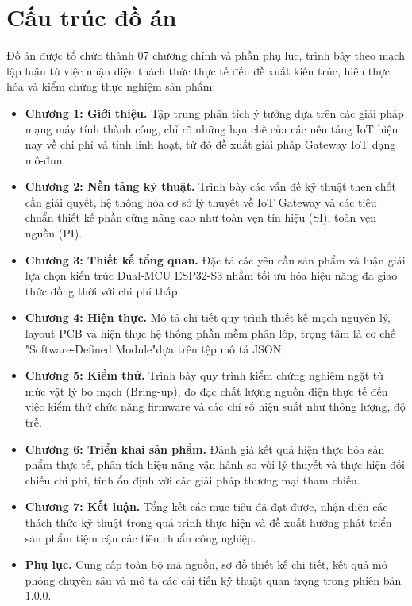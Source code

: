 \section{Cấu trúc đồ án}
    Đồ án được tổ chức thành 07 chương chính và phần phụ lục, trình bày theo mạch lập luận từ việc nhận diện thách thức thực tế đến đề xuất kiến trúc, hiện thực hóa và kiểm chứng thực nghiệm sản phẩm:

    \begin{itemize}
        \item \textbf{Chương 1: Giới thiệu.} Tập trung phân tích ý tưởng dựa trên các giải pháp mạng máy tính thành công, chỉ rõ những hạn chế của các nền tảng IoT hiện nay về chi phí và tính linh hoạt, từ đó đề xuất giải pháp Gateway IoT dạng mô-đun.
        
        \item \textbf{Chương 2: Nền tảng kỹ thuật.} Trình bày các vấn đề kỹ thuật then chốt cần giải quyết, hệ thống hóa cơ sở lý thuyết về IoT Gateway và các tiêu chuẩn thiết kế phần cứng nâng cao như toàn vẹn tín hiệu (SI), toàn vẹn nguồn (PI).
        
        \item \textbf{Chương 3: Thiết kế tổng quan.} Đặc tả các yêu cầu sản phẩm và luận giải lựa chọn kiến trúc Dual-MCU ESP32-S3 nhằm tối ưu hóa hiệu năng đa giao thức đồng thời với chi phí thấp.
        
        \item \textbf{Chương 4: Hiện thực.} Mô tả chi tiết quy trình thiết kế mạch nguyên lý, layout PCB và hiện thực hệ thống phần mềm phân lớp, trọng tâm là cơ chế "Software-Defined Module"\space dựa trên tệp mô tả JSON.
        
        \item \textbf{Chương 5: Kiểm thử.} Trình bày quy trình kiểm chứng nghiêm ngặt từ mức vật lý bo mạch (Bring-up), đo đạc chất lượng nguồn điện thực tế đến việc kiểm thử chức năng firmware và các chỉ số hiệu suất như thông lượng, độ trễ.
        
        \item \textbf{Chương 6: Triển khai sản phẩm.} Đánh giá kết quả hiện thực hóa sản phẩm thực tế, phân tích hiệu năng vận hành so với lý thuyết và thực hiện đối chiếu chi phí, tính ổn định với các giải pháp thương mại tham chiếu.
        
        \item \textbf{Chương 7: Kết luận.} Tổng kết các mục tiêu đã đạt được, nhận diện các thách thức kỹ thuật trong quá trình thực hiện và đề xuất hướng phát triển sản phẩm tiệm cận các tiêu chuẩn công nghiệp.
        
        \item \textbf{Phụ lục.} Cung cấp toàn bộ mã nguồn, sơ đồ thiết kế chi tiết, kết quả mô phỏng chuyên sâu và mô tả các cải tiến kỹ thuật quan trọng trong phiên bản 1.0.0.
    \end{itemize}